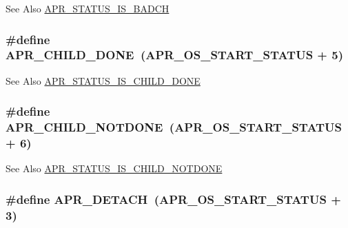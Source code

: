\begin{DoxySeeAlso}{See Also}
\hyperlink{group___a_p_r___s_t_a_t_u_s___i_s_ga20308232897ebff445dc10d0b69a0be2}{A\-P\-R\-\_\-\-S\-T\-A\-T\-U\-S\-\_\-\-I\-S\-\_\-\-B\-A\-D\-C\-H} 
\end{DoxySeeAlso}
\hypertarget{group___a_p_r___error_ga2a78375cab66b8c1a4e06329e0cfcaf4}{
\subsubsection[{A\-P\-R\-\_\-\-C\-H\-I\-L\-D\-\_\-\-D\-O\-N\-E}]{\setlength{\rightskip}{0pt plus 5cm}\#define A\-P\-R\-\_\-\-C\-H\-I\-L\-D\-\_\-\-D\-O\-N\-E~({\bf A\-P\-R\-\_\-\-O\-S\-\_\-\-S\-T\-A\-R\-T\-\_\-\-S\-T\-A\-T\-U\-S} + 5)}}\label{group___a_p_r___error_ga2a78375cab66b8c1a4e06329e0cfcaf4}
\begin{DoxySeeAlso}{See Also}
\hyperlink{group___a_p_r___s_t_a_t_u_s___i_s_ga1e6539dfa172cef4026105ca33b2b208}{A\-P\-R\-\_\-\-S\-T\-A\-T\-U\-S\-\_\-\-I\-S\-\_\-\-C\-H\-I\-L\-D\-\_\-\-D\-O\-N\-E} 
\end{DoxySeeAlso}
\hypertarget{group___a_p_r___error_ga00bba31c29774cce3e72a31f88610340}{
\subsubsection[{A\-P\-R\-\_\-\-C\-H\-I\-L\-D\-\_\-\-N\-O\-T\-D\-O\-N\-E}]{\setlength{\rightskip}{0pt plus 5cm}\#define A\-P\-R\-\_\-\-C\-H\-I\-L\-D\-\_\-\-N\-O\-T\-D\-O\-N\-E~({\bf A\-P\-R\-\_\-\-O\-S\-\_\-\-S\-T\-A\-R\-T\-\_\-\-S\-T\-A\-T\-U\-S} + 6)}}\label{group___a_p_r___error_ga00bba31c29774cce3e72a31f88610340}
\begin{DoxySeeAlso}{See Also}
\hyperlink{group___a_p_r___s_t_a_t_u_s___i_s_ga86190a4a2c04bbbbedc2491bb93ab432}{A\-P\-R\-\_\-\-S\-T\-A\-T\-U\-S\-\_\-\-I\-S\-\_\-\-C\-H\-I\-L\-D\-\_\-\-N\-O\-T\-D\-O\-N\-E} 
\end{DoxySeeAlso}
\hypertarget{group___a_p_r___error_gab3f8849983a52f6558016303fb4f5cff}{
\subsubsection[{A\-P\-R\-\_\-\-D\-E\-T\-A\-C\-H}]{\setlength{\rightskip}{0pt plus 5cm}\#define A\-P\-R\-\_\-\-D\-E\-T\-A\-C\-H~({\bf A\-P\-R\-\_\-\-O\-S\-\_\-\-S\-T\-A\-R\-T\-\_\-\-S\-T\-A\-T\-U\-S} + 3)}}\label{group___a_p_r___error_gab3f8849983a52f6558016303fb4f5cff}
